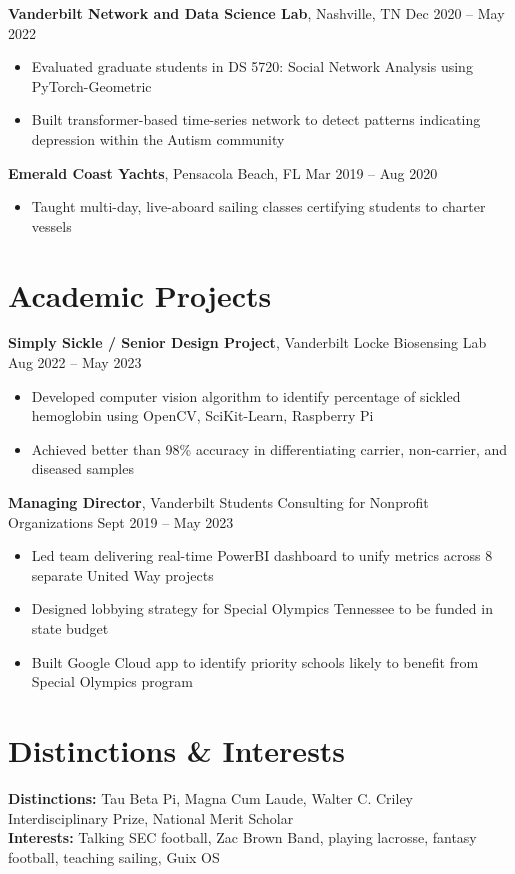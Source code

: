 \documentclass[10pt]{article}
\newcommand{\roleheader}[3]{
  \vspace{0.8ex}
  \textbf{#1}, #2 \hfill #3
}
\newcommand{\itemizedrole}[5]{
  \roleheader{#1}{#2}{#3 -- #4}

  \begin{itemize}
    #5
  \end{itemize}
}
\begin{document}
\itemizedrole
{Vanderbilt Network and Data Science Lab}
{Nashville, TN}
{Dec 2020}
{May 2022}
{

	\item Evaluated graduate students in DS 5720: Social Network Analysis using PyTorch-Geometric
	\item Built transformer-based time-series network to detect patterns indicating depression within the Autism community
}

\itemizedrole
{Emerald Coast Yachts}
{Pensacola Beach, FL}
{Mar 2019}
{Aug 2020}
{
	\item Taught multi-day, live-aboard sailing classes certifying students to charter vessels
}


\section*{Academic Projects}
\itemizedrole
{Simply Sickle / Senior Design Project}
{Vanderbilt Locke Biosensing Lab}
{Aug 2022}
{May 2023}
{
	\item Developed computer vision algorithm to identify percentage of sickled hemoglobin using OpenCV, SciKit-Learn, Raspberry Pi
	\item Achieved better than 98\% accuracy in differentiating carrier, non-carrier, and diseased samples
}

\itemizedrole
{Managing Director}
{Vanderbilt Students Consulting for Nonprofit Organizations}
{Sept 2019}
{May 2023}
{
	\item Led team delivering real-time PowerBI dashboard to unify metrics across 8 separate United Way projects
	\item Designed lobbying strategy for Special Olympics Tennessee to be funded in state budget
	\item Built Google Cloud app to identify priority schools likely to benefit from Special Olympics program
}


\section*{Distinctions \& Interests}
\textbf{Distinctions:} Tau Beta Pi, Magna Cum Laude, Walter C. Criley Interdisciplinary Prize, National Merit Scholar \\
\textbf{Interests:} Talking SEC football, Zac Brown Band, playing lacrosse, fantasy football, teaching sailing, Guix OS
\end{document}
